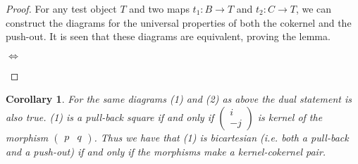 \documentclass[12pt]{article}
\newtheorem{corollary}{Corollary}[theorem]
\theoremstyle{definition}
\theoremstyle{remark}
\begin{document}
            \begin{proof}
                For any test object $T$ and two maps $t_1:B\rightarrow T$ and $t_2:C\rightarrow T$, we can construct the diagrams for the universal properties of both the cokernel and the push-out. It is seen that these diagrams are equivalent, proving the lemma.
                \begin{center}
                    $\Leftrightarrow$
                \end{center}
            \end{proof}

            \begin{corollary}
                For the same diagrams (1) and (2) as above the dual statement is also true. (1) is a pull-back square if and only if $\begin{pmatrix}
                    i \\ -j
                \end{pmatrix}$ is kernel of the morphism $\begin{pmatrix}
                    p & q
                \end{pmatrix}$. Thus we have that (1) is bicartesian (i.e. both a pull-back and a push-out) if and only if the morphisms make a kernel-cokernel pair.
            \end{corollary}
\end{document}
